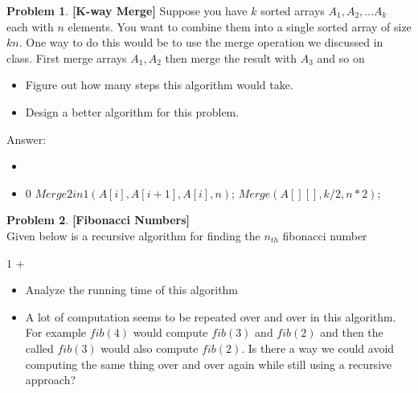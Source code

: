 \documentclass{article}
\theoremstyle{definition}
\newtheorem{Q}{Problem}
\newcommand{\code}[2]{\begin{algorithm}[H]\caption{: #1}\begin{algorithmic}#2\end{algorithmic}\end{algorithm}}
\begin{document}
\begin{algorithm}
\caption{}\label{}
\begin{algorithmic}
 \EndIf
 \EndIf


\EndProcedure
\end{algorithmic}
\end{algorithm}
\pagebreak
\begin{Q}
\textbf{[K-way Merge]}  Suppose you have $k$ sorted arrays $A_1,A_2,...A_k$ each with $n$ elements. You want to combine them into a single sorted array of size $kn$. One way to do this would be to use the merge operation we discussed in class. First merge arrays $A_1,A_2$ then merge the result with $A_3$ and so on
 \begin{itemize}
  \item Figure out how many steps this algorithm would take.
  \item Design a better algorithm for this problem.
 \end{itemize}
\end{Q}
\begin{A}
Answer: 
\begin{itemize}
\item  {}
\item 
 \code{}
 {
 
 	    \State \Return $0$	
  \For{$(i=1;i<=k;i+=2)$}
     \State  $Merge2in1(A[i],A[i+1],A[i],n)$;
  \EndFor
    \State  $Merge(A[][],k/2,n*2)$;
 \EndFunction
 }
\end{itemize}
\end{A}
\pagebreak
\begin{Q}
\textbf{[Fibonacci Numbers]}\\
 Given below is a recursive algorithm for finding the $n_{th}$ fibonacci number
 \code{}
 {
 	 	\State \Return $1$
		\Else \State \Return \Call{fib}{n-1} + \Call{fib}{n-2}
 	 	\EndIf
 	 	
 	\EndFunction
 }
 \begin{itemize}
 	\item Analyze the running time of this algorithm
 	\item A lot of computation seems to be repeated over and over in this algorithm. For example $fib(4)$ 	would compute $fib(3)$ and $fib(2)$ and then the called $fib(3)$ would also compute $fib(2)$. Is 	there a way we could avoid computing the same thing over and over again while still using a recursive approach?
 \end{itemize}
\end{Q}
\end{document}
